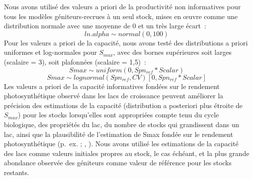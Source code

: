 \documentclass[french,11pt]{book}
\begin{document}
Nous avons utilisé des valeurs a priori de la productivité non informatives pour tous les modèles géniteurs-recrues à un seul stock, mises en œuvre comme une distribution normale avec une moyenne de 0 et un très large écart~:
\begin{equation} 
  ln.alpha \sim normal(0,100)
  \label{eq:ProductivityPrior}
\end{equation}
Pour les valeurs a priori de la capacité, nous avons testé des distributions a priori uniformes et log-normales pour \(S_{max}\), avec des bornes supérieures soit larges (scalaire = 3), soit plafonnées (scalaire = 1,5)~:
\begin{equation} 
  Smax \sim uniform(0,Spn_{ref}*Scalar)
  \label{eq:UniformCapacityPrior}
\end{equation}
\begin{equation} 
  Smax \sim lognormal(Spn_{ref},CV) [0,Spn_{ref} * Scalar]
  \label{eq:LognormalCapacityPrior}
\end{equation}
Les valeurs a priori de la capacité informatives fondées sur le rendement photosynthétique observé dans les lacs de croissance peuvent améliorer la précision des estimations de la capacité (distribution a posteriori plus étroite de \(S_{max}\)) pour les stocks lorsqu'elles sont appropriées compte tenu du cycle biologique, des propriétés du lac, du nombre de stocks qui grandissent dans un lac, ainsi que la plausibilité de l'estimation de Smax fondée sur le rendement photosynthétique (p.~ex. ; , ). Nous avons utilisé les estimations de la capacité des lacs comme valeurs initiales propres au stock, le cas échéant, et la plus grande abondance observée des géniteurs comme valeur de référence pour les stocks restants.
\end{document}

